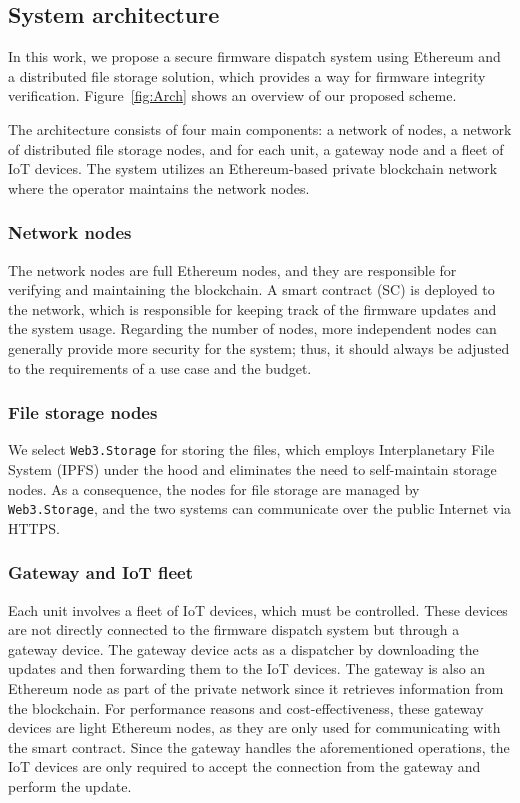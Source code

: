 \documentclass[conference]{IEEEtran}
\begin{document}
\subsection{System architecture}

In this work, we propose a secure firmware dispatch system using Ethereum and a distributed file storage solution, which provides a way for firmware integrity verification. Figure~\ref{fig:Arch} shows an overview of our proposed scheme.

The architecture consists of four main components: a network of nodes, a network of distributed file storage nodes, and for each unit, a gateway node and a fleet of IoT devices. The system utilizes an Ethereum-based private blockchain network where the operator maintains the network nodes.


\subsubsection{Network nodes}

The network nodes are full Ethereum nodes, and they are responsible for verifying and maintaining the blockchain. A smart contract (SC) is deployed to the network, which is responsible for keeping track of the firmware updates and the system usage. Regarding the number of nodes, more independent nodes can generally provide more security for the system; thus, it should always be adjusted to the requirements of a use case and the budget.

\subsubsection{File storage nodes}

We select \texttt{Web3.Storage} for storing the files, which employs Interplanetary File System (IPFS) under the hood and eliminates the need to self-maintain storage nodes. As a consequence, the nodes for file storage are managed by \texttt{Web3.Storage}, and the two systems can communicate over the public Internet via HTTPS.

\subsubsection{Gateway and IoT fleet}

Each unit involves a fleet of IoT devices, which must be controlled. These devices are not directly connected to the firmware dispatch system but through a gateway device. The gateway device acts as a dispatcher by downloading the updates and then forwarding them to the IoT devices. The gateway is also an Ethereum node as part of the private network since it retrieves information from the blockchain. For performance reasons and cost-effectiveness, these gateway devices are light Ethereum nodes, as they are only used for communicating with the smart contract. Since the gateway handles the aforementioned operations, the IoT devices are only required to accept the connection from the gateway and perform the update.
\end{document}

